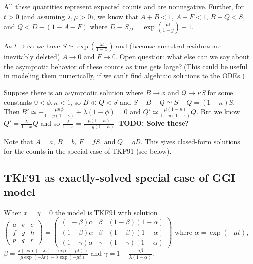 \documentclass{article}
\begin{document}
All these quantities represent expected counts and are nonnegative.
Further, for $t>0$ (and assuming $\lambda,\mu > 0$), we know that
$A+B<1$, $A+F<1$, $B+Q<S$, and $Q<D-(1-A-F)$
where $D \equiv S_D = \exp\left(\frac{\mu t}{1-y}\right) - 1$.

As $t \to \infty$ we have $S \simeq \exp\left(\frac{\lambda t}{1-x}\right)$ and (because ancestral residues are inevitably deleted) $A \to 0$ and $F \to 0$.
Open question: what else can we say about the asymptotic behavior of these counts as time gets large?
(This could be useful in modeling them numerically, if we can't find algebraic solutions to the ODEs.)

Suppose there is an asymptotic solution where $B \to \phi$ and $Q \to \kappa S$ for some constants $0<\phi,\kappa<1$, so $B \ll Q < S$ and $S-B-Q \simeq S-Q = (1-\kappa)S$.
Then $B' \simeq -\frac{\mu \kappa \phi}{1 - y(1 - \kappa)} + \lambda (1 - \phi) = 0$
and $Q' \simeq \frac{\mu(1-\kappa)}{1 - y(1 - \kappa)} Q$.
But we know $Q' = \frac{\lambda}{1-x}Q$ and so $\frac{\lambda}{1-x} = \frac{\mu(1-\kappa)}{1 - y(1 - \kappa)}$.
{\bf TODO: Solve these?}


Note that $A=a$, $B=b$, $F=fS$, and $Q=qD$.
This gives closed-form solutions for the counts in the special case of TKF91 (see below).

\subsection{TKF91 as exactly-solved special case of GGI model}

When $x=y=0$ the model is TKF91 \cite{ThorneEtAl91}
with solution
$
\begin{pmatrix}
a & b & c \\
f & g & h \\
p & q & r 
\end{pmatrix}
=
\begin{pmatrix}
(1-\beta)\alpha & \beta & (1-\beta)(1-\alpha) \\
(1-\beta)\alpha & \beta & (1-\beta)(1-\alpha) \\
(1-\gamma)\alpha & \gamma & (1-\gamma)(1-\alpha)
\end{pmatrix}
$
where
$\alpha = \exp(-\mu t)$,
$\beta = \frac{\lambda \left( \exp(-\lambda t) - \exp(-\mu t) \right)}{\mu \exp(-\lambda t) - \lambda \exp(-\mu t)}$
and
$\gamma = 1 - \frac{\mu \beta}{\lambda (1 - \alpha)}$.
\end{document}
